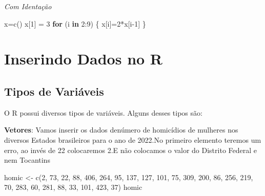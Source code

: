 \documentclass[
  letterpaper,
  DIV=11,
  numbers=noendperiod]{scrreprt}
\newenvironment{Shaded}{\begin{snugshade}}{\end{snugshade}}
\newcommand{\ControlFlowTok}[1]{\textcolor[rgb]{0.00,0.23,0.31}{\textbf{#1}}}
\newcommand{\DecValTok}[1]{\textcolor[rgb]{0.68,0.00,0.00}{#1}}
\newcommand{\FunctionTok}[1]{\textcolor[rgb]{0.28,0.35,0.67}{#1}}
\newcommand{\NormalTok}[1]{\textcolor[rgb]{0.00,0.23,0.31}{#1}}
\newcommand{\OtherTok}[1]{\textcolor[rgb]{0.00,0.23,0.31}{#1}}
\newcommand{\SpecialCharTok}[1]{\textcolor[rgb]{0.37,0.37,0.37}{#1}}
\begin{document}
\emph{Com Identação}

\begin{Shaded}
\begin{Highlighting}[]
\NormalTok{x}\OtherTok{=}\FunctionTok{c}\NormalTok{()}
\NormalTok{x[}\DecValTok{1}\NormalTok{] }\OtherTok{=} \DecValTok{3}
\ControlFlowTok{for}\NormalTok{ (i }\ControlFlowTok{in} \DecValTok{2}\SpecialCharTok{:}\DecValTok{9}\NormalTok{) \{ }
\NormalTok{  x[i]}\OtherTok{=}\DecValTok{2}\SpecialCharTok{*}\NormalTok{x[i}\DecValTok{{-}1}\NormalTok{]}
\NormalTok{\}}
\end{Highlighting}
\end{Shaded}

\section{Inserindo Dados no R}\label{inserindo-dados-no-r}

\subsection{Tipos de Variáveis}\label{tipos-de-variuxe1veis}

O R possui diversos tipos de variáveis. Alguns desses tipos são:

\textbf{Vetores}: Vamos inserir os dados denúmero de homicídios de
mulheres nos diversos Estados brasileiros para o ano de 2022.No primeiro
elemento teremos um erro, ao invés de 22 colocaremos 2.E não colocamos o
valor do Distrito Federal e nem Tocantins

\begin{Shaded}
\begin{Highlighting}[]
\NormalTok{homic }\OtherTok{\textless{}{-}} \FunctionTok{c}\NormalTok{(}\DecValTok{2}\NormalTok{,  }\DecValTok{73}\NormalTok{,  }\DecValTok{22}\NormalTok{,  }\DecValTok{88}\NormalTok{,  }\DecValTok{406}\NormalTok{,  }\DecValTok{264}\NormalTok{,    }\DecValTok{95}\NormalTok{,  }\DecValTok{137}\NormalTok{,  }\DecValTok{127}\NormalTok{,  }\DecValTok{101}\NormalTok{,  }\DecValTok{75}\NormalTok{,  }\DecValTok{309}\NormalTok{,  }\DecValTok{200}\NormalTok{,  }\DecValTok{86}\NormalTok{,  }\DecValTok{256}\NormalTok{,  }\DecValTok{219}\NormalTok{,  }\DecValTok{70}\NormalTok{,  }\DecValTok{283}\NormalTok{,  }\DecValTok{60}\NormalTok{,  }\DecValTok{281}\NormalTok{,  }\DecValTok{88}\NormalTok{,  }\DecValTok{33}\NormalTok{,  }\DecValTok{101}\NormalTok{,  }\DecValTok{423}\NormalTok{,  }\DecValTok{37}\NormalTok{)}
\NormalTok{homic}
\end{Highlighting}
\end{Shaded}
\end{document}

